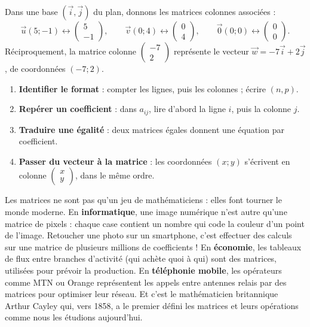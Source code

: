 \documentclass[11pt]{article}
\begin{document}
\begin{exemplebox}
Dans une base $(\vec{i}, \vec{j})$ du plan, donnons les matrices colonnes associées :
\[
\vec{u}(5 ; -1) \leftrightarrow \begin{pmatrix} 5 \\ -1 \end{pmatrix}, \qquad
\vec{v}(0 ; 4) \leftrightarrow \begin{pmatrix} 0 \\ 4 \end{pmatrix}, \qquad
\vec{0}(0 ; 0) \leftrightarrow \begin{pmatrix} 0 \\ 0 \end{pmatrix}.
\]
Réciproquement, la matrice colonne $\begin{pmatrix} -7 \\ 2 \end{pmatrix}$ représente le vecteur $\vec{w} = -7\vec{i} + 2\vec{j}$, de coordonnées $(-7 ; 2)$.
\end{exemplebox}

\begin{methode}
\begin{enumerate}
\item \textbf{Identifier le format} : compter les lignes, puis les colonnes ; écrire $(n,p)$.
\item \textbf{Repérer un coefficient} : dans $a_{ij}$, lire d'abord la ligne $i$, puis la colonne $j$.
\item \textbf{Traduire une égalité} : deux matrices égales donnent une équation par coefficient.
\item \textbf{Passer du vecteur à la matrice} : les coordonnées $(x ; y)$ s'écrivent en colonne $\begin{pmatrix} x \\ y \end{pmatrix}$, dans le même ordre.
\end{enumerate}
\end{methode}

\begin{savaistu}
Les matrices ne sont pas qu'un jeu de mathématiciens : elles font tourner le monde moderne. En \textbf{informatique}, une image numérique n'est autre qu'une matrice de pixels : chaque case contient un nombre qui code la couleur d'un point de l'image. Retoucher une photo sur un smartphone, c'est effectuer des calculs sur une matrice de plusieurs millions de coefficients ! En \textbf{économie}, les tableaux de flux entre branches d'activité (qui achète quoi à qui) sont des matrices, utilisées pour prévoir la production. En \textbf{téléphonie mobile}, les opérateurs comme MTN ou Orange représentent les appels entre antennes relais par des matrices pour optimiser leur réseau. Et c'est le mathématicien britannique Arthur Cayley qui, vers 1858, a le premier défini les matrices et leurs opérations comme nous les étudions aujourd'hui.
\end{savaistu}
\end{document}
